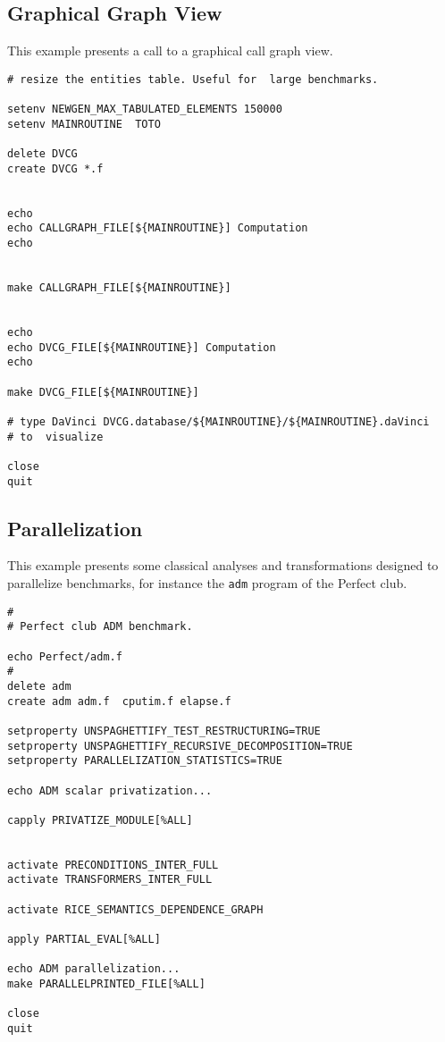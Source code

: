 \documentclass[a4paper]{article}
\begin{document}
\subsection{Graphical  Graph View}
\label{exm5}

This example presents a call to a graphical call graph view.

\begin{verbatim}
# resize the entities table. Useful for  large benchmarks. 

setenv NEWGEN_MAX_TABULATED_ELEMENTS 150000
setenv MAINROUTINE  TOTO 

delete DVCG
create DVCG *.f


echo
echo CALLGRAPH_FILE[${MAINROUTINE}] Computation
echo


make CALLGRAPH_FILE[${MAINROUTINE}]


echo
echo DVCG_FILE[${MAINROUTINE}] Computation
echo

make DVCG_FILE[${MAINROUTINE}]

# type DaVinci DVCG.database/${MAINROUTINE}/${MAINROUTINE}.daVinci
# to  visualize 

close 
quit
\end{verbatim}


\subsection{Parallelization}
\label{exm6}

This example presents some classical analyses and transformations designed
to parallelize benchmarks, for instance the \texttt{adm} program of the
Perfect club.

\begin{verbatim}
#
# Perfect club ADM benchmark.

echo Perfect/adm.f
#
delete adm
create adm adm.f  cputim.f elapse.f 

setproperty UNSPAGHETTIFY_TEST_RESTRUCTURING=TRUE
setproperty UNSPAGHETTIFY_RECURSIVE_DECOMPOSITION=TRUE
setproperty PARALLELIZATION_STATISTICS=TRUE

echo ADM scalar privatization...
 
capply PRIVATIZE_MODULE[%ALL]


activate PRECONDITIONS_INTER_FULL
activate TRANSFORMERS_INTER_FULL

activate RICE_SEMANTICS_DEPENDENCE_GRAPH

apply PARTIAL_EVAL[%ALL]

echo ADM parallelization...
make PARALLELPRINTED_FILE[%ALL]

close
quit
\end{verbatim}
\end{document}

